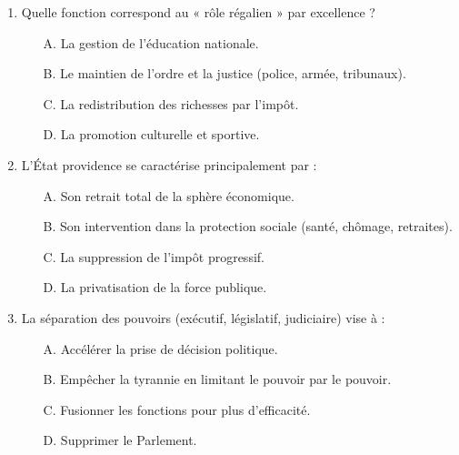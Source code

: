 \documentclass[11pt]{article}
\begin{document}
\begin{exercice}
\begin{enumerate}
    \item Quelle fonction correspond au « rôle régalien » par excellence ?
    \begin{itemize}
        \item[A.] La gestion de l'éducation nationale.
        \item[B.] Le maintien de l'ordre et la justice (police, armée, tribunaux).
        \item[C.] La redistribution des richesses par l'impôt.
        \item[D.] La promotion culturelle et sportive.
    \end{itemize}
    \item L'État providence se caractérise principalement par :
    \begin{itemize}
        \item[A.] Son retrait total de la sphère économique.
        \item[B.] Son intervention dans la protection sociale (santé, chômage, retraites).
        \item[C.] La suppression de l'impôt progressif.
        \item[D.] La privatisation de la force publique.
    \end{itemize}
    \item La séparation des pouvoirs (exécutif, législatif, judiciaire) vise à :
    \begin{itemize}
        \item[A.] Accélérer la prise de décision politique.
        \item[B.] Empêcher la tyrannie en limitant le pouvoir par le pouvoir.
        \item[C.] Fusionner les fonctions pour plus d'efficacité.
        \item[D.] Supprimer le Parlement.
    \end{itemize}
\end{enumerate}
\end{exercice}
\end{document}
